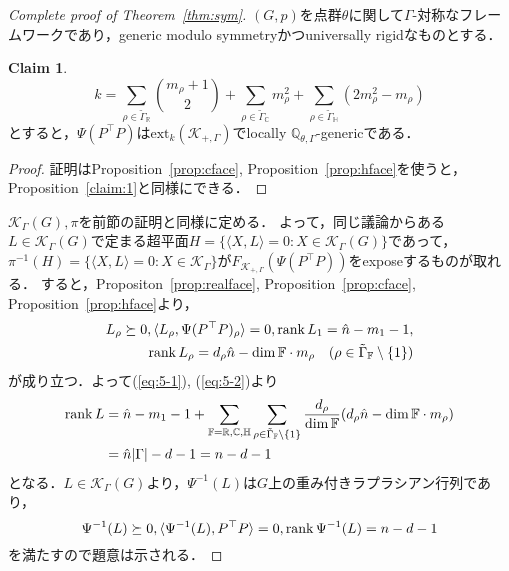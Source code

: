 \documentclass[11pt]{article}
\theoremstyle{definition}
\newtheorem{claim}[defi]{Claim}
\begin{document}
    \begin{proof}[Complete proof of Theorem~\ref{thm:sym}]
        $(G,p)$を点群$\theta$に関して$\Gamma$-対称なフレームワークであり，generic modulo symmetryかつuniversally rigidなものとする．
        \begin{claim} \label{claim:2}
            \[
            k=\sum_{\rho \in \tilde{\Gamma}_\mathbb{R}} \binom{m_\rho +1}{2} 
            + \sum_{\rho \in \tilde{\Gamma}_\mathbb{C}} m_\rho^2
            + \sum_{\rho \in \tilde{\Gamma}_\mathbb{H}} (2m_\rho^2-m_\rho)
            \]
            とすると，$\Psi(P^\top P)$は$\text{ext}_k(\mathcal{K}_{+,\Gamma})$でlocally $\mathbb{Q}_{\theta,\Gamma}$-genericである．
        \end{claim}
        \begin{proof}
            証明はProposition~\ref{prop:cface}, Proposition~\ref{prop:hface}を使うと，Proposition~\ref{claim:1}と同様にできる．
        \end{proof}
        $\mathcal{K}_\Gamma(G), \pi$を前節の証明と同様に定める．
        よって，同じ議論からある$L \in \mathcal{K}_\Gamma(G)$で定まる超平面$H=\{\langle X,L \rangle =0 : X \in \mathcal{K}_\Gamma(G) \}$であって，
        $\pi^{-1}(H)=\{\langle X,L \rangle =0 : X \in \mathcal{K}_\Gamma \}$が$F_{\mathcal{K}_{+,\Gamma}}(\Psi(P^\top P))$をexposeするものが取れる．
        すると，Propositon~\ref{prop:realface}, Proposition~\ref{prop:cface}, Proposition~\ref{prop:hface}より，
        \begin{align*}
            L_\rho \succeq 0, \langle L_\rho, \Psi(P^\top P)_\rho \rangle =0, \rank L_1 = \hat{n}-m_1-1, \\ 
            \rank L_\rho = d_\rho\hat{n} - \dim \mathbb{F} \cdot m_\rho \quad (\rho \in \tilde{\Gamma}_\mathbb{F} \setminus \{1\})
        \end{align*}
        が成り立つ．よって(\ref{eq:5-1}), (\ref{eq:5-2})より
        \begin{align*}
            \rank L &= \hat{n}-m_1-1 + \sum_{\mathbb{F} = \mathbb{R}, \mathbb{C}, \mathbb{H}}  
            \sum_{\rho \in \tilde{\Gamma}_\mathbb{F} \setminus \{1\}}  \frac{d_\rho}{\dim \mathbb{F}}(d_\rho\hat{n} - \dim \mathbb{F} \cdot m_\rho) \\
            &=\hat{n}|\Gamma| - d -1 = n-d-1
        \end{align*}
        となる．$L\in \mathcal{K}_\Gamma(G)$より，$\Psi^{-1}(L)$は$G$上の重み付きラプラシアン行列であり，
        \[
            \Psi^{-1}(L) \succeq 0, \langle \Psi^{-1}(L), P^\top P \rangle =0, \rank \Psi^{-1}(L)=n-d-1
        \]
        を満たすので題意は示される．
    \end{proof}
\end{document}
